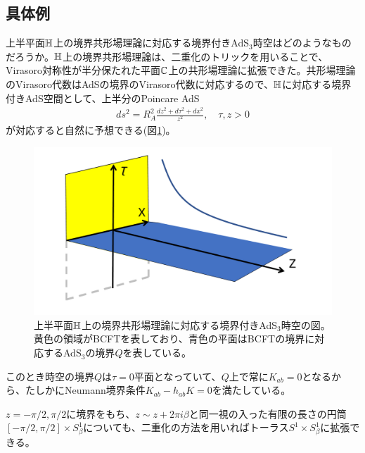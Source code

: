 \subsection{具体例}
上半平面$\mathbb{H}$上の境界共形場理論に対応する境界付きAdS$_3$時空はどのようなものだろうか。$\mathbb{H}$上の境界共形場理論は、二重化のトリックを用いることで、Virasoro対称性が半分保たれた平面$\mathbb{C}$上の共形場理論に拡張できた。共形場理論のVirasoro代数はAdSの境界のVirasoro代数に対応するので、$\mathbb{H}$に対応する境界付きAdS空間として、上半分のPoincare AdS
\begin{align}
ds^2=R_A^2 \frac{dz^2+d\tau^2+dx^2}{z^2},\quad \tau,z>0
\end{align}
が対応すると自然に予想できる(図\ref{fig:uhpadsbcft})。
\begin{figure}[h]
	\centering
	\includegraphics[width=0.7\linewidth]{UHPadsbcft.pdf}
	\caption{上半平面$\mathbb{H}$上の境界共形場理論に対応する境界付きAdS$_3$時空の図。黄色の領域がBCFTを表しており、青色の平面はBCFTの境界に対応するAdS$_3$の境界$Q$を表している。}
	\label{fig:uhpadsbcft}
\end{figure}

このとき時空の境界$Q$は$\tau=0$平面となっていて、$Q$上で常に$K_{ab}=0$となるから、たしかにNeumann境界条件$K_{ab}-h_{ab}K=0$を満たしている。

$z=-\pi/2,\pi/2$に境界をもち、$z\sim z+2\pi i\beta$と同一視の入った有限の長さの円筒$[-\pi/2,\pi/2]\times S_{\beta}^1$についても、二重化の方法を用いればトーラス$S^1\times S_{\beta}^1$に拡張できる。

